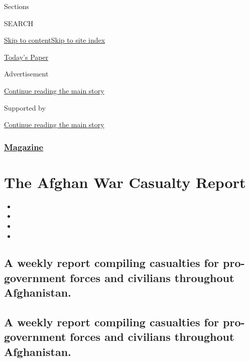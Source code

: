 Sections

SEARCH

\protect\hyperlink{site-content}{Skip to
content}\protect\hyperlink{site-index}{Skip to site index}

\href{https://myaccount.nytimes3xbfgragh.onion/auth/login?response_type=cookie\&client_id=vi}{}

\href{https://www.nytimes3xbfgragh.onion/section/todayspaper}{Today's
Paper}

Advertisement

\protect\hyperlink{after-top}{Continue reading the main story}

Supported by

\protect\hyperlink{after-sponsor}{Continue reading the main story}

\hypertarget{magazine}{%
\subsubsection{\texorpdfstring{\href{/section/magazine}{Magazine}}{Magazine}}\label{magazine}}

\hypertarget{the-afghan-war-casualty-report}{%
\section{The Afghan War Casualty
Report}\label{the-afghan-war-casualty-report}}

\begin{itemize}
\item
\item
\item
\item
\end{itemize}

\hypertarget{a-weekly-report-compiling-casualties-for-pro-government-forces-and-civilians-throughout-afghanistan}{%
\subsection{A weekly report compiling casualties for pro-government
forces and civilians throughout
Afghanistan.}\label{a-weekly-report-compiling-casualties-for-pro-government-forces-and-civilians-throughout-afghanistan}}

\hypertarget{a-weekly-report-compiling-casualties-for-pro-government-forces-and-civilians-throughout-afghanistan-1}{%
\subsection{A weekly report compiling casualties for pro-government
forces and civilians throughout
Afghanistan.}\label{a-weekly-report-compiling-casualties-for-pro-government-forces-and-civilians-throughout-afghanistan-1}}

